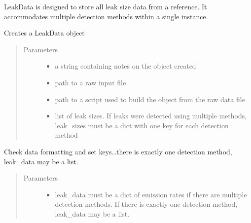 \documentclass[letterpaper,10pt,english]{sphinxmanual}
\begin{document}
\begin{fulllineitems}
\label{\detokenize{index:feast.input_data_classes.LeakData}}
LeakData is designed to store all leak size data from a reference. It accommodates multiple detection methods
within a single instance.

Creates a LeakData object
\begin{quote}\begin{description}
\item[{Parameters}] \leavevmode\begin{itemize}
\item {} 
 \textendash{} a string containing notes on the object created

\item {} 
 \textendash{} path to a raw input file

\item {} 
 \textendash{} path to a script used to build the object from the raw data file

\item {} 
 \textendash{} list of leak sizes. If leaks were detected using multiple methods, leak\_sizes must be a dict
with one key for each detection method

\end{itemize}

\end{description}\end{quote}

\begin{fulllineitems}
\label{\detokenize{index:feast.input_data_classes.LeakData.define_data}}
Check data formatting and set keys…there is exactly one detection method, leak\_data may be a list.
\begin{quote}\begin{description}
\item[{Parameters}] \leavevmode\begin{itemize}
\item {} 
 \textendash{} leak\_data must be a dict of emission rates if there are multiple detection methods. If
there is exactly one detection method, leak\_data may be a list.


\end{itemize}
\end{description}
\end{quote}
\end{fulllineitems}
\end{fulllineitems}
\end{document}
